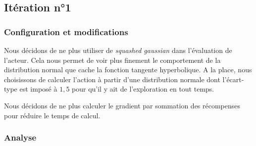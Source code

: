\subsection{Itération n°1}

\subsubsection{Configuration et modifications}

Nous décidons de ne plus utiliser de \emph{squashed gaussian} dans l'évaluation de l'acteur. Cela nous permet de voir plus finement le comportement de la distribution normal que cache la fonction tangente hyperbolique. A la place, nous choisissons de calculer l'action à partir d'une distribution normale dont l'écart-type est imposé à $1,5$ pour qu'il y ait de l'exploration en tout temps.

Nous décidons de ne plus calculer le gradient par sommation des récompenses pour réduire le temps de calcul.

\subsubsection{Analyse}

